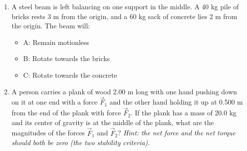 \documentclass[10pt]{article}
\begin{document}
\begin{enumerate}
\item A steel beam is left balancing on one support in the middle. A 40 kg pile of bricks rests 3 m from the origin, and a 60 kg sack of concrete lies 2 m from the origin.  The beam will:
\begin{itemize}
\item A: Remain motionless
\item B: Rotate towards the bricks
\item C: Rotate towards the concrete
\end{itemize}
\item A person carries a plank of wood 2.00 m long with one hand pushing down on it at one end with a force $\vec{F}_1$ and the other hand holding it up at 0.500 m from the end of the plank with force $\vec{F}_2$.  If the plank has a mass of 20.0 kg and its center of gravity is at the middle of the plank, what are the magnitudes of the forces $\vec{F}_1$ and $\vec{F}_2$? \textit{Hint: the net force and the net torque should both be zero (the two stability criteria).}\\ \vspace{3cm}
\end{enumerate}
\end{document}
